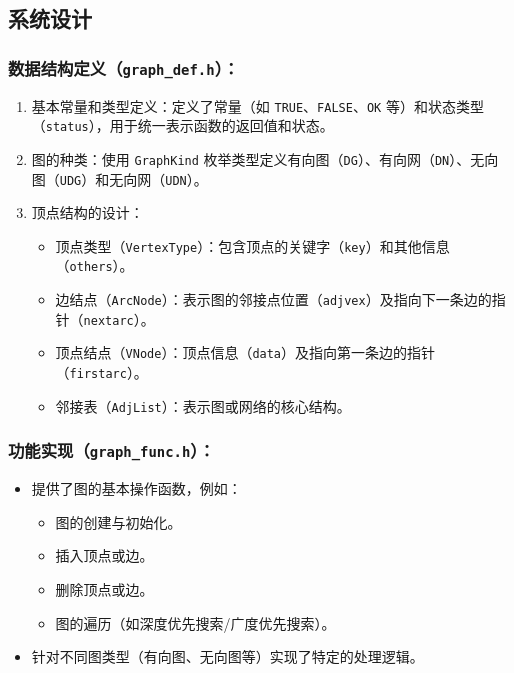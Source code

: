\documentclass[supercite]{Experimental_Report}
\theoremstyle{definition}
\begin{document}
\subsection{系统设计}

\subsubsection{数据结构定义（\texttt{graph\_def.h}）：}
\begin{enumerate}
  \item 基本常量和类型定义：定义了常量（如 \texttt{TRUE}、\texttt{FALSE}、\texttt{OK} 等）和状态类型（\texttt{status}），用于统一表示函数的返回值和状态。
  \item 图的种类：使用 \texttt{GraphKind} 枚举类型定义有向图（\texttt{DG}）、有向网（\texttt{DN}）、无向图（\texttt{UDG}）和无向网（\texttt{UDN}）。
  \item 顶点结构的设计：
    \begin{itemize}
      \item 顶点类型（\texttt{VertexType}）：包含顶点的关键字（\texttt{key}）和其他信息（\texttt{others}）。
      \item 边结点（\texttt{ArcNode}）：表示图的邻接点位置（\texttt{adjvex}）及指向下一条边的指针（\texttt{nextarc}）。
      \item 顶点结点（\texttt{VNode}）：顶点信息（\texttt{data}）及指向第一条边的指针（\texttt{firstarc}）。
      \item 邻接表（\texttt{AdjList}）：表示图或网络的核心结构。
    \end{itemize}
\end{enumerate}

\subsubsection{功能实现（\texttt{graph\_func.h}）：}
\begin{itemize}
  \item 提供了图的基本操作函数，例如：
    \begin{itemize}
      \item 图的创建与初始化。
      \item 插入顶点或边。
      \item 删除顶点或边。
      \item 图的遍历（如深度优先搜索/广度优先搜索）。
    \end{itemize}
  \item 针对不同图类型（有向图、无向图等）实现了特定的处理逻辑。
\end{itemize}
\end{document}
